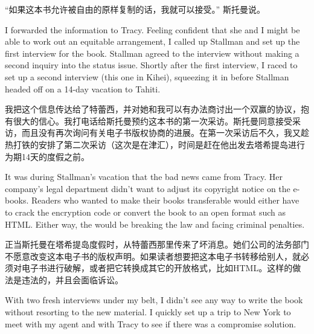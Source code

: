 \ifdefined\chs
``如果这本书允许被自由的原样复制的话，我就可以接受。'' 斯托曼说。%
\fi

\ifdefined\eng
I forwarded the information to Tracy. Feeling confident that she and I might be able to work out an equitable arrangement, I called up Stallman and set up the first interview for the book. Stallman agreed to the interview without making a second inquiry into the status issue. Shortly after the first interview, I raced to set up a second interview (this one in Kihei), squeezing it in before Stallman headed off on a 14-day vacation to Tahiti. %
\fi

\ifdefined\chs
我把这个信息传达给了特蕾西，并对她和我可以有办法商讨出一个双赢的协议，抱有很大的信心。我打电话给斯托曼预约这本书的第一次采访。斯托曼同意接受采访，而且没有再次询问有关电子书版权协商的进展。在第一次采访后不久，我又趁热打铁的安排了第二次采访（这次是在津汇），时间是赶在他出发去塔希提岛进行为期14天的度假之前。%
\fi

\ifdefined\eng
It was during Stallman's vacation that the bad news came from Tracy. Her company's legal department didn't want to adjust its copyright notice on the e-books. Readers who wanted to make their books transferable would either have to crack the encryption code or convert the book to an open format such as HTML. Either way, the would be breaking the law and facing criminal penalties.
\fi

\ifdefined\chs
正当斯托曼在塔希提岛度假时，从特蕾西那里传来了坏消息。她们公司的法务部门不愿意改变这本电子书的版权声明。如果读者想要把这本电子书转移给别人，就必须对电子书进行破解，或者把它转换成其它的开放格式，比如HTML。这样的做法是违法的，并且会面临诉讼。
\fi

\ifdefined\eng
With two fresh interviews under my belt, I didn't see any way to write the book without resorting to the new material. I quickly set up a trip to New York to meet with my agent and with Tracy to see if there was a compromise solution.
\fi

